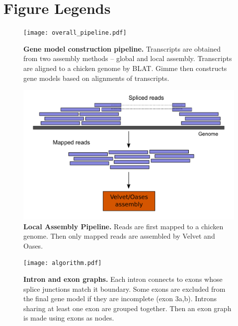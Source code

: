 \documentclass[10pt]{article}
\begin{document}
\section*{Figure Legends}
\begin{figure}[!ht]
\begin{center}
\texttt{[image: overall\_pipeline.pdf]}
\end{center}
\caption{
{\bf Gene model construction pipeline.} Transcripts are obtained from two assembly methods -- global and local assembly.
Transcripts are aligned to a chicken genome by BLAT. Gimme then constructs gene models based on alignments of transcripts.
}
\label{overall_pipeline}
\end{figure}

\begin{figure}[!ht]
\begin{center}
\includegraphics[width=5in]{local_assembly}
\end{center}
\caption{
{\bf Local Assembly Pipeline.}
Reads are first mapped to a chicken genome.
Then only mapped reads are assembled by Velvet and Oases.
}
\label{local_assembly}
\end{figure}

\begin{figure}[!ht]
\begin{center}
\texttt{[image: algorithm.pdf]}
\end{center}
\caption{
{\bf Intron and exon graphs.}
Each intron connects to exons whose splice junctions match it boundary.
Some exons are excluded from the final gene model if they are incomplete (exon 3a,b).
Introns sharing at least one exon are grouped together.
Then an exon graph is made using exons as nodes.
}
\label{algorithm}
\end{figure}
\end{document}
